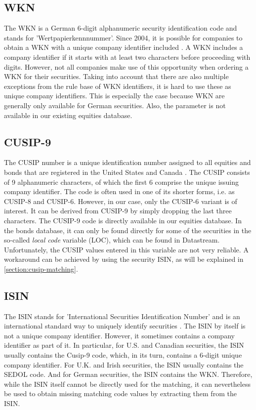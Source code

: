 \subsection{WKN}
The WKN is a German 6-digit alphanumeric security identification code and stands for 'Wertpapierkennnummer'. Since 2004, it is possible for companies to obtain a WKN with a unique company identifier included \cite{wkn}. A WKN includes a company identifier if it starts with at least two characters before proceeding with digits. However, not all companies make use of this opportunity when ordering a WKN for their securities. Taking into account that there are also multiple exceptions from the rule base of WKN identifiers, it is hard to use these as unique company identifiers. This is especially the case because WKN are generally only available for German securities. Also, the parameter is not available in our existing equities database. 

\subsection{CUSIP-9}
The CUSIP number is a unique identification number assigned to all equities and bonds that are registered in the United States and Canada \cite{cusip}. The CUSIP consists of 9 alphanumeric characters, of which the first 6 comprise the unique issuing company identifier. The code is often used in one of its shorter forms, i.e. as CUSIP-8 and CUSIP-6. However, in our case, only the CUSIP-6 variant is of interest. It can be derived from CUSIP-9 by simply dropping the last three characters. The CUSIP-9 code is directly available in our equities database. In the bonds database, it can only be found directly for some of the securities in the so-called \textit{local code} variable (LOC), which can be found in Datastream. Unfortunately, the CUSIP values entered in this variable are not very reliable. A workaround can be achieved by using the security ISIN, as will be explained in \ref{section:cusip-matching}. 

\subsection{ISIN}
The ISIN stands for 'International Securities Identification Number' and is an international standard way to uniquely identify securities \cite{isin}. The ISIN by itself is not a unique company identifier. However, it sometimes contains a company identifier as part of it. In particular, for U.S. and Canadian securities, the ISIN usually contains the Cusip-9 code, which, in its turn, contains a 6-digit unique company identifier. For U.K. and Irish securities, the ISIN usually contains the SEDOL code. And for German securities, the ISIN contains the WKN. Therefore, while the ISIN itself cannot be directly used for the matching, it can nevertheless be used to obtain missing matching code values by extracting them from the ISIN. 

